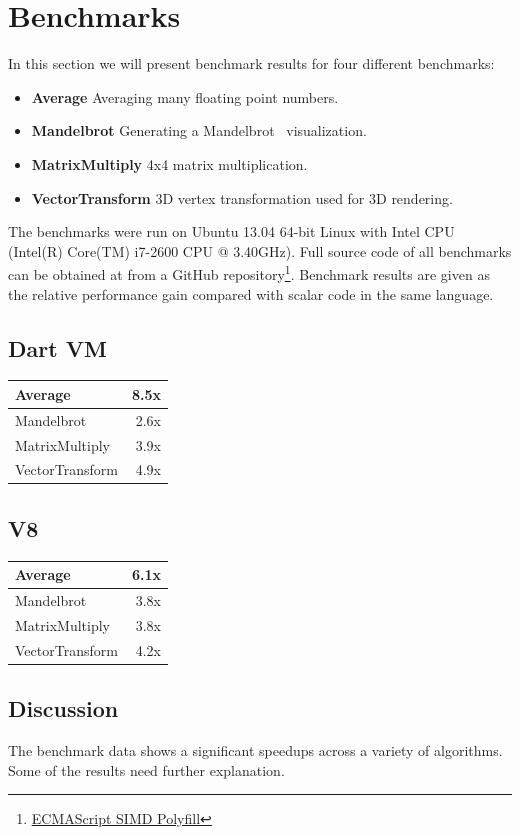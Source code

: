 \documentclass[preprint]{sigplanconf}
\begin{document}
\section{Benchmarks}
In this section we will present benchmark results for four different benchmarks:
\begin{itemize}
\item \textbf{Average} Averaging many floating point numbers.
\item \textbf{Mandelbrot} Generating a Mandelbrot~\cite{mandelbrot} visualization.
\item \textbf{MatrixMultiply} 4x4 matrix multiplication.
\item \textbf{VectorTransform} 3D vertex transformation used for 3D rendering.
\end{itemize}

The benchmarks were run on Ubuntu 13.04 64-bit Linux with Intel CPU (Intel(R) Core(TM) i7-2600 CPU @ 3.40GHz). Full source code of all benchmarks can be obtained at from
a GitHub repository\footnote{\href{https://github.com/johnmccutchan/ecmascript_simd/}{ECMAScript SIMD Polyfill}}. Benchmark results are given as the relative performance gain compared with scalar code in the same language.

\subsection{Dart VM}
\begin{tabular}{|l|r|}
\hline
 Average & 8.5x \\
 \hline
 Mandelbrot & 2.6x \\
 \hline
 MatrixMultiply & 3.9x \\
 \hline
 VectorTransform & 4.9x \\
 \hline
\end{tabular}

\subsection{V8}
\begin{tabular}{|l|r|}
\hline
 Average & 6.1x \\
 \hline
 Mandelbrot & 3.8x \\
 \hline
 MatrixMultiply & 3.8x \\
 \hline
 VectorTransform & 4.2x \\
 \hline
\end{tabular}

\subsection{Discussion}
The benchmark data shows a significant speedups across a variety of algorithms. Some of the results need further explanation. 
\end{document}
